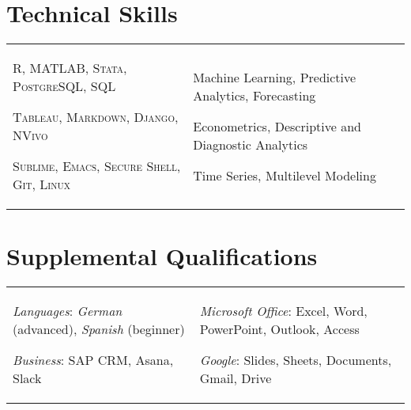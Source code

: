 \documentclass[a4paper,10pt]{article}
\begin{document}
\section{Technical Skills}
\begin{supertabular}{p{8.65cm} p{8.65cm}}

	\begin{enumerate*}[label =$\circ$, itemjoin={\newline}]
																\item \small \textsc{R, MATLAB, Stata, PostgreSQL, SQL}
																\item \small \textsc{Tableau, Markdown, Django, NVivo}
																\item \small \textsc{Sublime, Emacs, Secure Shell, Git, Linux}
																\end{enumerate*}


	& \begin{enumerate*}[label =$\circ$, itemjoin={\newline}]
                                \item \small Machine Learning, Predictive Analytics, Forecasting
                                \item \small Econometrics, Descriptive and Diagnostic Analytics
                                \item \small Time Series, Multilevel Modeling \end{enumerate*}  \vspace{2mm} \\



\end{supertabular}



\smallskip
\section{Supplemental Qualifications}
\begin{supertabular}{p{8.65cm} p{8.65cm}}
	\begin{enumerate*}[label =$\circ$, itemjoin={\newline}]
		\item \small \emph{Languages}: \emph{German} (advanced), \emph{Spanish} (beginner)
	 	\item \small \emph{Business}: SAP CRM, Asana, Slack
	\end{enumerate*}

	& \begin{enumerate*}[label =$\circ$, itemjoin={\newline}]
	 	\item \small \emph{Microsoft Office}: Excel, Word, PowerPoint, Outlook, Access
	 	\item \small \emph{Google}: Slides, Sheets, Documents, Gmail, Drive
	\end{enumerate*} \\

\end{supertabular}
\end{document}

